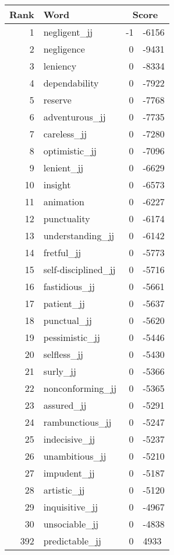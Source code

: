 \begin{longtable}[!htbp]{| rlr@{.}l |}
    \hline
    \textbf{Rank} & \textbf{Word} & \multicolumn{2}{c|}{\textbf{Score}} \\
    \hline
    \endhead
    1 & negligent\_jj & -1 & -6156 \\
    2 & negligence & 0 & -9431 \\
    3 & leniency & 0 & -8334 \\
    4 & dependability & 0 & -7922 \\
    5 & reserve & 0 & -7768 \\
    6 & adventurous\_jj & 0 & -7735 \\
    7 & careless\_jj & 0 & -7280 \\
    8 & optimistic\_jj & 0 & -7096 \\
    9 & lenient\_jj & 0 & -6629 \\
    10 & insight & 0 & -6573 \\
    11 & animation & 0 & -6227 \\
    12 & punctuality & 0 & -6174 \\
    13 & understanding\_jj & 0 & -6142 \\
    14 & fretful\_jj & 0 & -5773 \\
    15 & self-disciplined\_jj & 0 & -5716 \\
    16 & fastidious\_jj & 0 & -5661 \\
    17 & patient\_jj & 0 & -5637 \\
    18 & punctual\_jj & 0 & -5620 \\
    19 & pessimistic\_jj & 0 & -5446 \\
    20 & selfless\_jj & 0 & -5430 \\
    21 & surly\_jj & 0 & -5366 \\
    22 & nonconforming\_jj & 0 & -5365 \\
    23 & assured\_jj & 0 & -5291 \\
    24 & rambunctious\_jj & 0 & -5247 \\
    25 & indecisive\_jj & 0 & -5237 \\
    26 & unambitious\_jj & 0 & -5210 \\
    27 & impudent\_jj & 0 & -5187 \\
    28 & artistic\_jj & 0 & -5120 \\
    29 & inquisitive\_jj & 0 & -4967 \\
    30 & unsociable\_jj & 0 & -4838 \\
    392 & predictable\_jj & 0 & 4933 \\

\end{longtable}
